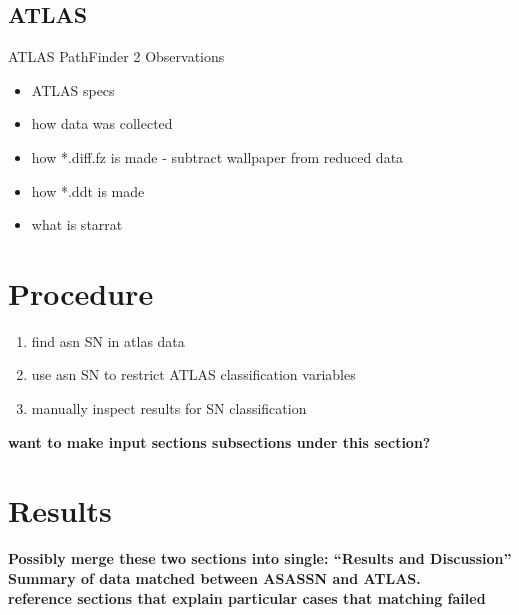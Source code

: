 \documentclass[aps,prb,twocolumn,superscriptaddress]{revtex4-1}
\begin{document}
\subsection{ATLAS}
ATLAS PathFinder 2 Observations
\begin{itemize}
	\item{} ATLAS specs
	\item{} how data was collected
	\item{} how *.diff.fz is made - subtract wallpaper from reduced data
	\item{} how *.ddt is made
	\item{} what is starrat
\end{itemize}



\section{Procedure}
\begin{enumerate}
	\item{} find asn SN in atlas data
	\item{} use asn SN to restrict ATLAS classification variables
	\item{} manually inspect results for SN classification
\end{enumerate}
{\bf want to make input sections subsections under this section?}


\newpage

\newpage







\section{Results}
{\bf Possibly merge these two sections into single: ``Results and Discussion''}\\
{\bf Summary of data matched between ASASSN and ATLAS.\\
reference sections that explain particular cases that matching failed}

\end{document}
